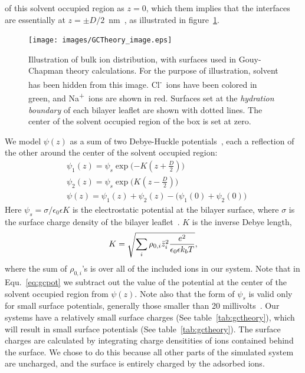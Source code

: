 \documentclass[12pt,preprint,times,openany,draft]{book}
\newcommand{\na}{Na\textsuperscript{+}~}
\newcommand{\cl}{Cl\textsuperscript{-}~}
\newcommand{\nmeter}{\si{\nm}~}
\begin{document}
of this solvent occupied region as $z=0$, which them implies that the interfaces are essentially 
at $z=\pm D/2$~\nmeter, as illustrated in figure~\ref{fig:gctheoryimg}. 

\begin{figure}
\caption{ 
Illustration of bulk ion distribution, with surfaces used in Gouy-Chapman theory
calculations. For the purpose of illustration, solvent has been hidden from this image. \cl ions have been
colored in green, and \na ions are shown in red. Surfaces set at the \emph{hydration boundary} of each
bilayer leaflet are shown with dotted lines. The center of the solvent occupied region of the box is set at zero.}
\label{fig:gctheoryimg}
\texttt{[image: images/GCTheory\_image.eps]}
\end{figure}
We model $\psi(z)$ as a sum of two Debye-Huckle 
potentials~\cite{israelachvili:2011:intermol}, each a reflection of the other around the center of the solvent occupied region:
\begin{align}
&\psi_{1}(z) = \psi_s \exp\bigg({-K(z+\frac{D}{2})}\bigg)\\
&\psi_{2}(z) = \psi_s \exp\bigg({K(z-\frac{D}{2})}\bigg)\\
\label{eq:gcpot}
&\psi(z) = \psi_1(z) + \psi_2(z) - \big({\psi_1(0)+\psi_2(0)}\big)
\end{align}
Here $\psi_s = \sigma/\epsilon_0\epsilon K$ is the electrostatic potential at the bilayer surface, where $\sigma$ 
is the surface charge density of the bilayer leaflet~\cite{israelachvili:2011:intermol}. $K$ is the inverse Debye length, 
\begin{equation}
\label{eq:debyelength}
K=\sqrt{\sum_{i} \rho_{0,i} \bar z_i^2\frac{\text{\si{\elementarycharge}}^2}{\epsilon_0 \epsilon k_bT}},
\end{equation}
where the sum of $\rho_{0,i}$'s is over all of the included ions in our system. Note that in Equ.~\ref{eq:gcpot} we 
subtract out the value of the potential at the center of the solvent occupied region from $\psi(z)$. 
Note also that the form of $\psi_s$ is valid only for small surface potentials, generally those smaller than 
20 millivolts~\cite{israelachvili:2011:intermol}. Our systems have a relatively small surface charges 
(See table~\ref{tab:gctheory}), 
which will result in small surface potentials (See table~\ref{tab:gctheory}). 
The surface charges are calculated by integrating 
charge densitities of ions contained behind the surface. We chose to do this because all other parts of 
the simulated system are uncharged, and the surface is entirely charged by the adsorbed ions.
\end{document}
